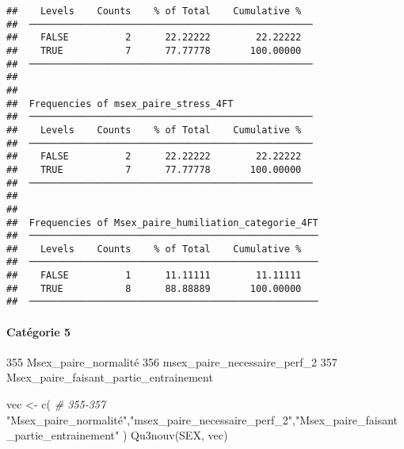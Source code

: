 \documentclass[
]{article}
\newenvironment{Shaded}{\begin{snugshade}}{\end{snugshade}}
\newcommand{\CommentTok}[1]{\textcolor[rgb]{0.56,0.35,0.01}{\textit{#1}}}
\newcommand{\FunctionTok}[1]{\textcolor[rgb]{0.00,0.00,0.00}{#1}}
\newcommand{\NormalTok}[1]{#1}
\newcommand{\OtherTok}[1]{\textcolor[rgb]{0.56,0.35,0.01}{#1}}
\newcommand{\StringTok}[1]{\textcolor[rgb]{0.31,0.60,0.02}{#1}}
\begin{document}
\begin{verbatim}
##    Levels    Counts    % of Total    Cumulative %   
##  ────────────────────────────────────────────────── 
##    FALSE          2      22.22222        22.22222   
##    TRUE           7      77.77778       100.00000   
##  ────────────────────────────────────────────────── 
## 
## 
##  Frequencies of msex_paire_stress_4FT               
##  ────────────────────────────────────────────────── 
##    Levels    Counts    % of Total    Cumulative %   
##  ────────────────────────────────────────────────── 
##    FALSE          2      22.22222        22.22222   
##    TRUE           7      77.77778       100.00000   
##  ────────────────────────────────────────────────── 
## 
## 
##  Frequencies of Msex_paire_humiliation_categorie_4FT 
##  ─────────────────────────────────────────────────── 
##    Levels    Counts    % of Total    Cumulative %   
##  ─────────────────────────────────────────────────── 
##    FALSE          1      11.11111        11.11111   
##    TRUE           8      88.88889       100.00000   
##  ───────────────────────────────────────────────────
\end{verbatim}

\hypertarget{catuxe9gorie-5}{%
\paragraph{Catégorie 5}\label{catuxe9gorie-5}}

355 Msex\_paire\_normalité 356 msex\_paire\_necessaire\_perf\_2 357
Msex\_paire\_faisant\_partie\_entrainement

\begin{Shaded}
\begin{Highlighting}[]
\NormalTok{vec }\OtherTok{\textless{}{-}} \FunctionTok{c}\NormalTok{(  }\CommentTok{\# 355{-}357}
  \StringTok{"Msex\_paire\_normalité"}\NormalTok{,}\StringTok{"msex\_paire\_necessaire\_perf\_2"}\NormalTok{,}\StringTok{"Msex\_paire\_faisant\_partie\_entrainement"}
\NormalTok{)}
\FunctionTok{Qu3nouv}\NormalTok{(SEX, vec)}
\end{Highlighting}
\end{Shaded}
\end{document}
